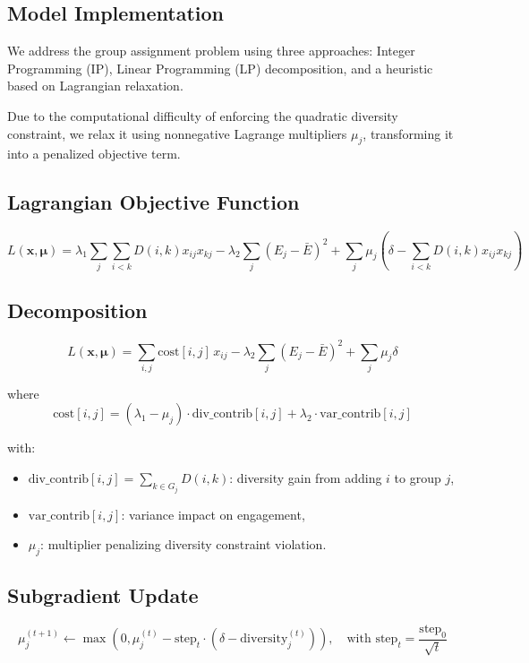 \subsection*{Model Implementation}

We address the group assignment problem using three approaches: Integer Programming (IP), Linear Programming (LP) decomposition, and a heuristic based on Lagrangian relaxation.

Due to the computational difficulty of enforcing the quadratic diversity constraint, we relax it using nonnegative Lagrange multipliers $\mu_j$, transforming it into a penalized objective term.

\subsection*{Lagrangian Objective Function}

\[
L(\mathbf{x}, \boldsymbol{\mu}) = \lambda_1 \sum_j \sum_{i<k} D(i,k) x_{ij} x_{kj} - \lambda_2 \sum_j (E_j - \bar{E})^2 + \sum_j \mu_j \left( \delta - \sum_{i<k} D(i,k) x_{ij} x_{kj} \right)
\]

\subsection*{Decomposition}

\[
L(\mathbf{x}, \boldsymbol{\mu}) = \sum_{i,j} \text{cost}[i,j] \, x_{ij} - \lambda_2 \sum_j (E_j - \bar{E})^2 + \sum_j \mu_j \delta
\]

where
\[
\text{cost}[i,j] = (\lambda_1 - \mu_j) \cdot \text{div\_contrib}[i,j] + \lambda_2 \cdot \text{var\_contrib}[i,j]
\]

with:
\begin{itemize}
    \item $\text{div\_contrib}[i,j] = \sum_{k \in G_j} D(i,k)$: diversity gain from adding $i$ to group $j$,
    \item $\text{var\_contrib}[i,j]$: variance impact on engagement,
    \item $\mu_j$: multiplier penalizing diversity constraint violation.
\end{itemize}

\subsection*{Subgradient Update}

\[
\mu_j^{(t+1)} \leftarrow \max(0, \mu_j^{(t)} - \text{step}_t \cdot (\delta - \text{diversity}_j^{(t)})), \quad \text{with } \text{step}_t = \frac{\text{step}_0}{\sqrt{t}}
\]

